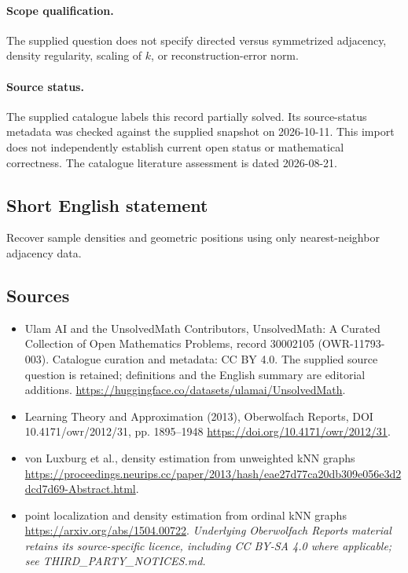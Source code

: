 \documentclass[11pt]{article}
\begin{document}
\paragraph{Scope qualification.}
The supplied question does not specify directed versus symmetrized adjacency, density regularity, scaling of $k$, or reconstruction-error norm.
\paragraph{Source status.}
The supplied catalogue labels this record partially solved. Its source-status metadata was checked against the supplied snapshot on 2026-10-11. This import does not independently establish current open status or mathematical correctness. The catalogue literature assessment is dated 2026-08-21.
\subsection{Short English statement}
Recover sample densities and geometric positions using only nearest-neighbor adjacency data.
\subsection{Sources}
\begin{itemize}
\item[S1] Ulam AI and the UnsolvedMath Contributors, UnsolvedMath: A Curated Collection of Open Mathematics Problems, record 30002105 (OWR-11793-003). Catalogue curation and metadata: CC BY 4.0. The supplied source question is retained; definitions and the English summary are editorial additions.
\url{https://huggingface.co/datasets/ulamai/UnsolvedMath}.
\item[S2] Learning Theory and Approximation (2013), Oberwolfach Reports, DOI 10.4171/owr/2012/31, pp. 1895--1948
\url{https://doi.org/10.4171/owr/2012/31}.
\item[S3] von Luxburg et al., density estimation from unweighted kNN graphs
\url{https://proceedings.neurips.cc/paper/2013/hash/eae27d77ca20db309e056e3d2dcd7d69-Abstract.html}.
\item[S4] point localization and density estimation from ordinal kNN graphs
\url{https://arxiv.org/abs/1504.00722}.
\textit{Underlying Oberwolfach Reports material retains its source-specific licence, including CC BY-SA 4.0 where applicable; see THIRD\_PARTY\_NOTICES.md.}
\end{itemize}
\end{document}
